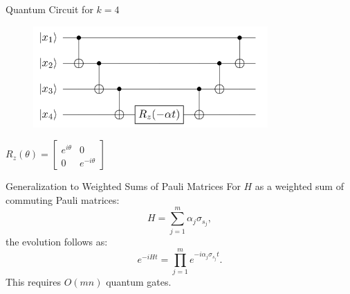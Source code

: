 \documentclass[aspectratio=169,xcolor=dvipsnames]{beamer}
\begin{document}
\begin{frame}{Quantum Circuit for $k=4$}
  \begin{center}
    \begin{figure}[htbp]
      \centering
      \includegraphics[width=0.8\textwidth]{rsc/circuit.png}
    \end{figure}

  \end{center}
  $R_z(\theta) = \begin{bmatrix} e^{i \theta} & 0 \\ 0 & e^{-i \theta} \end{bmatrix}$
\end{frame}

\begin{frame}{Generalization to Weighted Sums of Pauli Matrices}
  For $H$ as a weighted sum of commuting Pauli matrices:
  \begin{equation}
    H = \sum_{j=1}^{m} \alpha_j \sigma_{s_j},
  \end{equation}
  the evolution follows as:
  \begin{equation}
    e^{-i H t} = \prod_{j=1}^{m} e^{-i \alpha_j \sigma_{s_j} t}.
  \end{equation}
  This requires $O(mn)$ quantum gates.
\end{frame}


\end{document}
